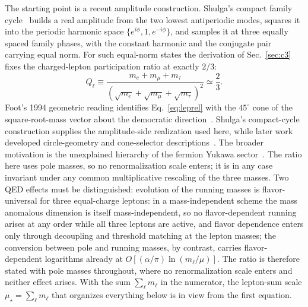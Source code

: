 \documentclass[aps,twocolumn,superscriptaddress,nofootinbib,floatfix]{revtex4-2}
\newcommand{\mstar}{\mu_\star}
\begin{document}
The starting point is a recent amplitude construction. Shulga's compact family cycle~\cite{Shulga2026} builds a real amplitude from the two lowest antiperiodic modes, squares it into the periodic harmonic space $\{e^{i\phi},1,e^{-i\phi}\}$, and samples it at three equally spaced family phases, with the constant harmonic and the conjugate pair carrying equal norm. For such equal-norm states the derivation of Sec.~\ref{sec:c3} fixes the charged-lepton participation ratio at exactly $2/3$:
\begin{equation}
Q_\ell\equiv
\frac{m_e+m_\mu+m_\tau}
{\left(\sqrt{m_e}+\sqrt{m_\mu}+\sqrt{m_\tau}\right)^2}
\simeq \frac23 .
\label{eq:leprel}
\end{equation}
Foot's 1994 geometric reading identifies Eq.~\eqref{eq:leprel} with the $45^\circ$ cone of the square-root-mass vector about the democratic direction~\cite{Foot1994}. Shulga's compact-cycle construction supplies the amplitude-side realization used here, while later work developed circle-geometry and cone-selector descriptions~\cite{Kocik2012,Li2026QR}. The broader motivation is the unexplained hierarchy of the fermion Yukawa sector~\cite{PDG2026}. The ratio here uses pole masses, so no renormalization scale enters; it is in any case invariant under any common multiplicative rescaling of the three masses. Two QED effects must be distinguished: evolution of the running masses is flavor-universal for three equal-charge leptons: in a mass-independent scheme the mass anomalous dimension is itself mass-independent, so no flavor-dependent running arises at any order while all three leptons are active, and flavor dependence enters only through decoupling and threshold matching at the lepton masses; the conversion between pole and running masses, by contrast, carries flavor-dependent logarithms already at $O[(\alpha/\pi)\ln(m_\ell/\mu)]$. The ratio is therefore stated with pole masses throughout, where no renormalization scale enters and neither effect arises. With the sum $\sum_\ell m_\ell$ in the numerator, the lepton-sum scale $\mstar=\sum_\ell m_\ell$ that organizes everything below is in view from the first equation.
\end{document}
